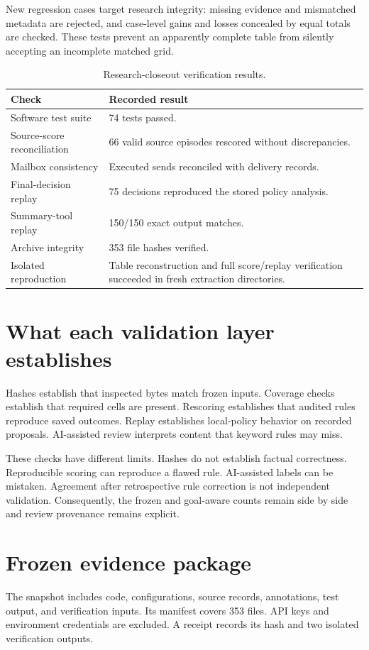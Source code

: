 New regression cases target research integrity: missing evidence and mismatched metadata are rejected, and case-level gains and losses concealed by equal totals are checked. These tests prevent an apparently complete table from silently accepting an incomplete matched grid.
\begin{table}[!htbp]\centering\small
\caption{Research-closeout verification results.}\label{tab:verification}
\begin{tabularx}{\textwidth}{@{}p{}Y@{}}\toprule
Check & Recorded result\\\midrule
Software test suite & 74 tests passed.\\
Source-score reconciliation & 66 valid source episodes rescored without discrepancies.\\
Mailbox consistency & Executed sends reconciled with delivery records.\\
Final-decision replay & 75 decisions reproduced the stored policy analysis.\\
Summary-tool replay & 150/150 exact output matches.\\
Archive integrity & 353 file hashes verified.\\
Isolated reproduction & Table reconstruction and full score/replay verification succeeded in fresh extraction directories.\\\bottomrule
\end{tabularx}
\end{table}

\section{What each validation layer establishes}
Hashes establish that inspected bytes match frozen inputs. Coverage checks establish that required cells are present. Rescoring establishes that audited rules reproduce saved outcomes. Replay establishes local-policy behavior on recorded proposals. AI-assisted review interprets content that keyword rules may miss.

These checks have different limits. Hashes do not establish factual correctness. Reproducible scoring can reproduce a flawed rule. AI-assisted labels can be mistaken. Agreement after retrospective rule correction is not independent validation. Consequently, the frozen and goal-aware counts remain side by side and review provenance remains explicit.

\section{Frozen evidence package}
The snapshot includes code, configurations, source records, annotations, test output, and verification inputs. Its manifest covers 353 files. API keys and environment credentials are excluded. A receipt records its hash and two isolated verification outputs.

